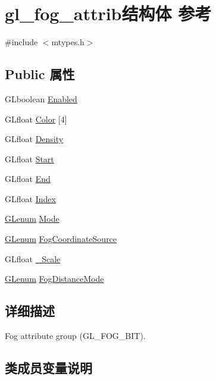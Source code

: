 \hypertarget{structgl__fog__attrib}{}\section{gl\+\_\+fog\+\_\+attrib结构体 参考}
\label{structgl__fog__attrib}


{\ttfamily \#include $<$mtypes.\+h$>$}

\subsection*{Public 属性}
\begin{DoxyCompactItemize}
\item 
G\+Lboolean \hyperlink{structgl__fog__attrib_ac64d924d1f9580e42ca938f2f9ce50ad}{Enabled}
\item 
G\+Lfloat \hyperlink{structgl__fog__attrib_ad40d6abf524a86ee895a6b1befa07159}{Color} \mbox{[}4\mbox{]}
\item 
G\+Lfloat \hyperlink{structgl__fog__attrib_a2717bbab40878c8a670e600c518e96fe}{Density}
\item 
G\+Lfloat \hyperlink{structgl__fog__attrib_ac652c0262b8d1733fa4a77ad49b41327}{Start}
\item 
G\+Lfloat \hyperlink{structgl__fog__attrib_a92f6cea26e56b55c2d957afddfd1d12d}{End}
\item 
G\+Lfloat \hyperlink{structgl__fog__attrib_a08843f5013b1f04868d85dae4bdc5e87}{Index}
\item 
\hyperlink{interfacevoid}{G\+Lenum} \hyperlink{structgl__fog__attrib_a4c5c1804a2717faebbbae1d4870112b5}{Mode}
\item 
\hyperlink{interfacevoid}{G\+Lenum} \hyperlink{structgl__fog__attrib_af1cb72741fd1e46ca9208c5d97d60726}{Fog\+Coordinate\+Source}
\item 
G\+Lfloat \hyperlink{structgl__fog__attrib_a5812e68559841b22659517f7bf3de680}{\+\_\+\+Scale}
\item 
\hyperlink{interfacevoid}{G\+Lenum} \hyperlink{structgl__fog__attrib_abbb5fa71c98b4d4ed6605694bd5bfb64}{Fog\+Distance\+Mode}
\end{DoxyCompactItemize}


\subsection{详细描述}
Fog attribute group (G\+L\+\_\+\+F\+O\+G\+\_\+\+B\+IT). 

\subsection{类成员变量说明}
\mbox{\label{structgl__fog__attrib_a5812e68559841b22659517f7bf3de680}} 
